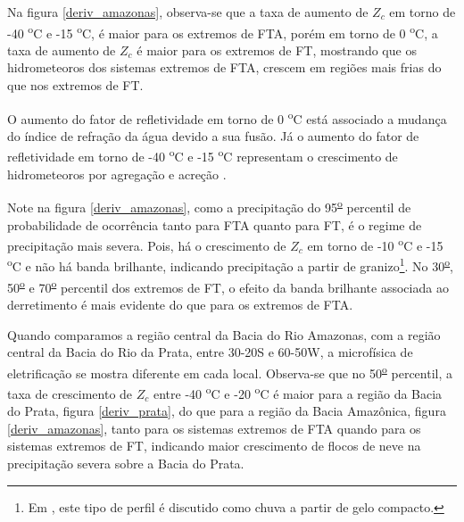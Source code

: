 
Na figura \ref{deriv_amazonas}, observa-se que a taxa de aumento de $Z_c$ em torno de -40 \textsuperscript{o}C e -15 \textsuperscript{o}C, é maior para os extremos de FTA, porém em torno de 0 \textsuperscript{o}C, a taxa de aumento de $Z_c$ é maior para os extremos de FT, mostrando que os hidrometeoros dos sistemas extremos de FTA, crescem em regiões mais frias do que nos extremos de FT.


O aumento do fator de refletividade em torno de 0 \textsuperscript{o}C está associado a mudança do índice de refração da água devido a sua fusão. Já o aumento do fator de refletividade em torno de -40 \textsuperscript{o}C e -15 \textsuperscript{o}C representam o crescimento de hidrometeoros por agregação e acreção \cite{Fabry1995,Takahashi1978}.

Note na figura \ref{deriv_amazonas}, como a precipitação do 95\textsuperscript{\underline{o}} percentil de probabilidade de ocorrência tanto para FTA quanto para FT, é o regime de precipitação mais severa. Pois, há o crescimento de $Z_c$ em torno de -10 \textsuperscript{o}C e -15 \textsuperscript{o}C e não há banda brilhante, indicando precipitação a partir de granizo\footnote{Em \cite{Fabry1995}, este tipo de perfil é discutido como chuva a partir de gelo compacto.}. No 30\textsuperscript{\underline{o}}, 50\textsuperscript{\underline{o}} e 70\textsuperscript{\underline{o}} percentil dos extremos de FT, o efeito da banda brilhante associada ao derretimento é mais evidente do que para os extremos de FTA. 

Quando comparamos a região central da Bacia do Rio Amazonas, com a região central da Bacia do Rio da Prata, entre 30-20S e 60-50W, a microfísica de eletrificação se mostra diferente em cada local. Observa-se que no 50\textsuperscript{\underline{o}} percentil, a taxa de crescimento de $Z_c$ entre -40 \textsuperscript{o}C e -20 \textsuperscript{o}C é maior para a região da Bacia do Prata, figura \ref{deriv_prata}, do que para a região da Bacia Amazônica, figura \ref{deriv_amazonas}, tanto para os sistemas extremos de FTA quando para os sistemas extremos de FT, indicando maior crescimento de flocos de neve na precipitação severa sobre a Bacia do Prata. 


